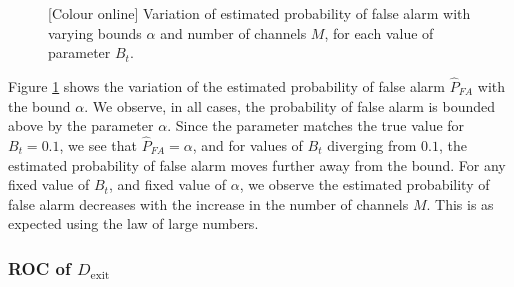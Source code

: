 \documentclass[11pt]{article}
\begin{document}
\begin{figure}[h!]
\caption{[Colour online] Variation of estimated probability of false alarm with varying bounds $\alpha$ and number of channels $M$, for each value of parameter $B_{t}$.}
\label{fig:MCdexit}
\end{figure}

Figure \ref{fig:MCdexit} shows the variation of the estimated probability of false alarm $\hat{P}_{FA}$ with the bound $\alpha$. We observe, in all cases, the probability of false alarm is bounded above by the parameter $\alpha$. Since the parameter matches the true value for $B_{t}=0.1$, we see that $\hat{P}_{FA}=\alpha$, and for values of $B_{t}$ diverging from $0.1$, the estimated probability of false alarm moves further away from the bound. For any fixed value of $B_{t}$, and fixed value of $\alpha$, we observe the estimated probability of false alarm decreases with the increase in the number of channels $M$. This is as expected using the law of large numbers.


\subsubsection{ROC of $D_{\text{exit}}$}
\label{subsubsec:exitDetector_roc}
\end{document}
